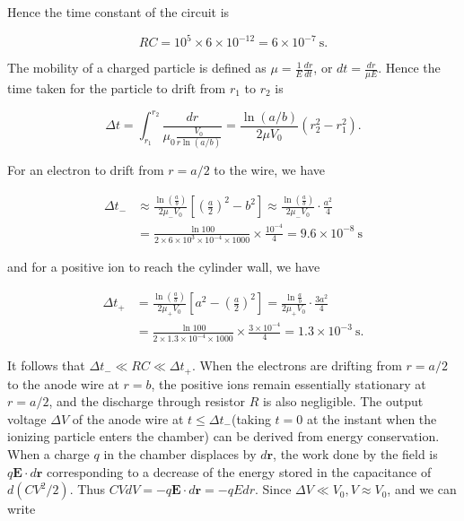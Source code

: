 \documentclass[10pt]{article}
\begin{document}
Hence the time constant of the circuit is

$$
R C=10^{5} \times 6 \times 10^{-12}=6 \times 10^{-7} \mathrm{~s} .
$$

The mobility of a charged particle is defined as $\mu=\frac{1}{E} \frac{d r}{d t}$, or $d t=\frac{d r}{\mu E}$. Hence the time taken for the particle to drift from $r_{1}$ to $r_{2}$ is

$$
\Delta t=\int_{r_{1}}^{r_{2}} \frac{d r}{\mu_{0} \frac{V_{0}}{r \ln (a / b)}}=\frac{\ln (a / b)}{2 \mu V_{0}}\left(r_{2}^{2}-r_{1}^{2}\right) .
$$

For an electron to drift from $r=a / 2$ to the wire, we have

$$
\begin{aligned}
\Delta t_{-} & \approx \frac{\ln \left(\frac{a}{b}\right)}{2 \mu_{-} V_{0}}\left[\left(\frac{a}{2}\right)^{2}-b^{2}\right] \approx \frac{\ln \left(\frac{a}{b}\right)}{2 \mu_{-} V_{0}} \cdot \frac{a^{2}}{4} \\
&=\frac{\ln 100}{2 \times 6 \times 10^{3} \times 10^{-4} \times 1000} \times \frac{10^{-4}}{4}=9.6 \times 10^{-8} \mathrm{~s}
\end{aligned}
$$

and for a positive ion to reach the cylinder wall, we have

$$
\begin{aligned}
\Delta t_{+} &=\frac{\ln \left(\frac{a}{b}\right)}{2 \mu_{+} V_{0}}\left[a^{2}-\left(\frac{a}{2}\right)^{2}\right]=\frac{\ln \frac{a}{b}}{2 \mu_{+} V_{0}} \cdot \frac{3 a^{2}}{4} \\
&=\frac{\ln 100}{2 \times 1.3 \times 10^{-4} \times 1000} \times \frac{3 \times 10^{-4}}{4}=1.3 \times 10^{-3} \mathrm{~s} .
\end{aligned}
$$

It follows that $\Delta t_{-} \ll R C \ll \Delta t_{+}$. When the electrons are drifting from $r=a / 2$ to the anode wire at $r=b$, the positive ions remain essentially stationary at $r=a / 2$, and the discharge through resistor $R$ is also negligible. The output voltage $\Delta V$ of the anode wire at $t \leq \Delta t_{-}$(taking $t=0$ at the instant when the ionizing particle enters the chamber) can be derived from energy conservation. When a charge $q$ in the chamber displaces by $d \mathbf{r}$, the work done by the field is $q \mathbf{E} \cdot d \mathbf{r}$ corresponding to a decrease of the energy stored in the capacitance of $d\left(C V^{2} / 2\right)$. Thus $C V d V=-q \mathbf{E} \cdot d \mathbf{r}=-q E d r$. Since $\Delta V \ll V_{0}, V \approx V_{0}$, and we can write
\end{document}
